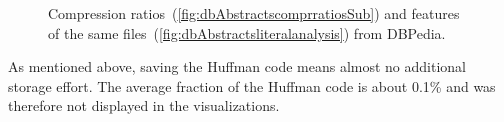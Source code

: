 \begin{figure}[h]
	\centering
	\hfill
	\caption{Compression ratios~(\ref{fig:dbAbstractscomprratiosSub}) and features of the same files~(\ref{fig:dbAbstractsliteralanalysis}) from DBPedia.}
	\label{fig:dbAbstracts}
\end{figure}

As mentioned above, saving the Huffman code means almost no additional storage effort. The average fraction of the Huffman code is about 0.1\% and was therefore not displayed in the visualizations.

